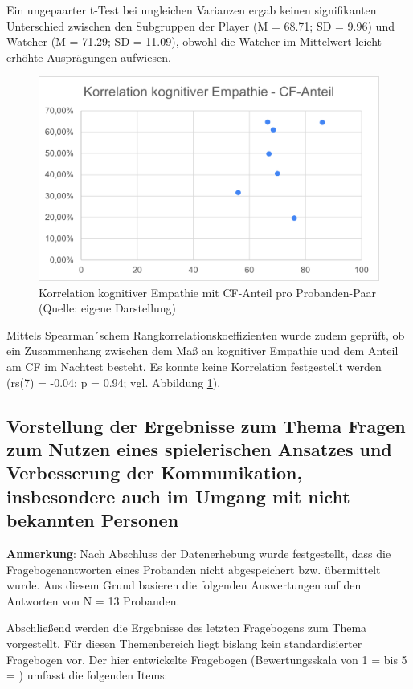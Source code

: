 Ein ungepaarter t-Test bei ungleichen Varianzen ergab keinen signifikanten Unterschied zwischen den Subgruppen der Player (M = 68.71; SD = 9.96) und Watcher (M = 71.29; SD = 11.09), obwohl die Watcher im Mittelwert leicht erhöhte Ausprägungen aufwiesen.

\begin{figure}[ht]
\centering
\includegraphics[width=1\linewidth]{content/pictures/Korrelation_Kognitive_Empathie_cfh.png}
\caption{Korrelation kognitiver Empathie mit \ac{CF}-Anteil pro Probanden-Paar (Quelle: eigene Darstellung)}
\label{fig:correlation_kognitive_empathy_cfh}
\end{figure}

Mittels Spearman´schem Rangkorrelationskoeffizienten wurde zudem geprüft, ob ein Zusammenhang zwischen dem Maß an kognitiver Empathie und dem Anteil am \ac{CF} im Nachtest besteht. Es konnte keine Korrelation festgestellt werden (rs(7) = -0.04; p = 0.94; vgl. Abbildung \ref{fig:correlation_kognitive_empathy_cfh}).

\subsection{Vorstellung der Ergebnisse zum Thema Fragen zum Nutzen eines spielerischen Ansatzes und Verbesserung der Kommunikation, insbesondere auch im Umgang mit nicht bekannten Personen}
\textbf{Anmerkung}: Nach Abschluss der Datenerhebung wurde festgestellt, dass die Fragebogenantworten eines Probanden nicht abgespeichert bzw. übermittelt wurde. Aus diesem Grund basieren die folgenden Auswertungen auf den Antworten von N = 13 Probanden.

Abschließend werden die Ergebnisse des letzten Fragebogens zum Thema  vorgestellt. Für diesen Themenbereich liegt bislang kein standardisierter Fragebogen vor. Der hier entwickelte Fragebogen (Bewertungsskala von 1 =  bis 5 = ) umfasst die folgenden Items:

